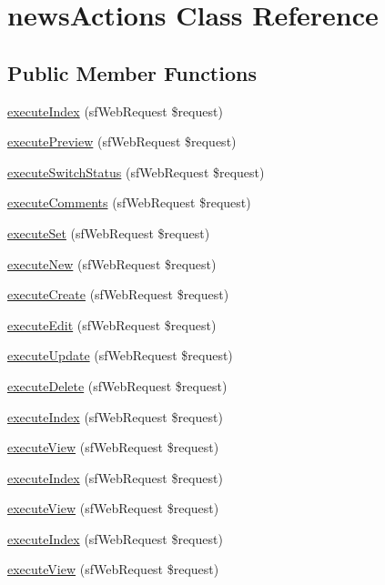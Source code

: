 \hypertarget{classnews_actions}{\section{news\-Actions Class Reference}
\label{classnews_actions}
}
\subsection*{Public Member Functions}
\begin{DoxyCompactItemize}
\item 
\hyperlink{classnews_actions_a948cc911eb1d9f77990be54af3b2080f}{execute\-Index} (sf\-Web\-Request \$request)
\item 
\hyperlink{classnews_actions_a0ab27fcd648cfc89c7402cc832068909}{execute\-Preview} (sf\-Web\-Request \$request)
\item 
\hyperlink{classnews_actions_a84f3809dd64121e2fd999bf9e0c8b2ba}{execute\-Switch\-Status} (sf\-Web\-Request \$request)
\item 
\hyperlink{classnews_actions_a62fda782931a54a0024eca338d6df280}{execute\-Comments} (sf\-Web\-Request \$request)
\item 
\hyperlink{classnews_actions_a428a5d1aef483f911bfdcd6af15111c8}{execute\-Set} (sf\-Web\-Request \$request)
\item 
\hyperlink{classnews_actions_a0ffbea56560c6c633dae68ec22aff21c}{execute\-New} (sf\-Web\-Request \$request)
\item 
\hyperlink{classnews_actions_a75837617743fb64dca82d8133b2c662a}{execute\-Create} (sf\-Web\-Request \$request)
\item 
\hyperlink{classnews_actions_af4d8fedd4b28f3398826a1bb8fa54394}{execute\-Edit} (sf\-Web\-Request \$request)
\item 
\hyperlink{classnews_actions_af7b4f51862add3c2ebb54efc136a0840}{execute\-Update} (sf\-Web\-Request \$request)
\item 
\hyperlink{classnews_actions_a52b5b11b11a0070dd2662257520c045a}{execute\-Delete} (sf\-Web\-Request \$request)
\item 
\hyperlink{classnews_actions_a948cc911eb1d9f77990be54af3b2080f}{execute\-Index} (sf\-Web\-Request \$request)
\item 
\hyperlink{classnews_actions_ad61d212fa3f7e8cb4190700a8a670606}{execute\-View} (sf\-Web\-Request \$request)
\item 
\hyperlink{classnews_actions_a948cc911eb1d9f77990be54af3b2080f}{execute\-Index} (sf\-Web\-Request \$request)
\item 
\hyperlink{classnews_actions_ad61d212fa3f7e8cb4190700a8a670606}{execute\-View} (sf\-Web\-Request \$request)
\item 
\hyperlink{classnews_actions_a948cc911eb1d9f77990be54af3b2080f}{execute\-Index} (sf\-Web\-Request \$request)
\item 
\hyperlink{classnews_actions_ad61d212fa3f7e8cb4190700a8a670606}{execute\-View} (sf\-Web\-Request \$request)
\end{DoxyCompactItemize}
